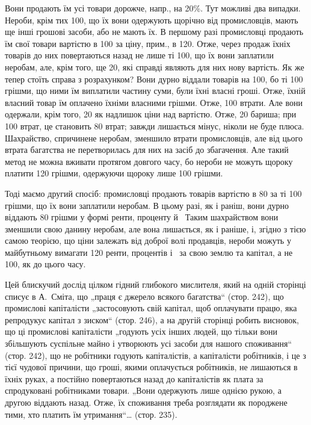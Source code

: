 \parcont{}  %
Вони продають їм усі товари дорожче, напр., на 20\%. Тут можливі два випадки. Нероби, крім
тих 100, що їх вони одержують щорічно від промисловців, мають ще інші грошові засоби, або
не мають їх. В першому разі промисловці продають їм свої товари вартістю в 100 за ціну,
прим., в 120. Отже, через продаж їхніх товарів до них повертаються назад не лише ті 100, що їх вони заплатили неробам, але, крім того, ще 20, які справді являють для них
нову вартість. Як же тепер стоїть справа з розрахунком? Вони дурно віддали товарів на 100,
бо ті 100 грішми, що ними їм виплатили частину суми, були їхні власні гроші. Отже, їхній
власний товар їм оплачено їхніми власними грішми. Отже, 100 втрати. Але вони одержали,
крім того, 20 як надлишок ціни над вартістю. Отже, 20 бариша; при 100
втрат, це становить 80 втрат; завжди лишається мінус, ніколи не буде плюса. Шахрайство,
спричинене неробам, зменшило втрати промисловців, але від цього втрата багатства не перетворилась
для них на засіб до збагачення. Але такий метод не можна вживати протягом довгого часу, бо нероби не
можуть щороку платити 120 грішми, одержуючи щороку лише 100 грішми.

Тоді маємо другий спосіб: промисловці продають товарів вартістю в 80 за ті 100
грішми, що їх вони заплатили неробам. В цьому разі, як і раніш, вони дурно віддають 80
грішми у формі ренти, проценту й~ Таким шахрайством вони зменшили свою данину неробам, але
вона лишається, як і раніше, і, згідно з тією самою теорією, що ціни залежать від доброї волі
продавців, нероби можуть у майбутньому вимагати 120 ренти, процентів і~ за свою
землю та капітал, а не 100, як до цього часу.

Цей блискучий дослід цілком гідний глибокого мислителя, який на одній сторінці списує в А.~Сміта, що
„праця є джерело всякого багатства“ (стор. 242), що промислові капіталісти „застосовують свій
капітал, щоб оплачувати працю, яка репродукує капітал з зиском“ (стор. 246), а на другій сторінці
робить висновок, що ці промислові капіталісти „годують
усіх інших людей, що тільки вони збільшують суспільне майно і утворюють усі засоби для нашого
споживання“ (стор. 242), що не робітники годують капіталістів, а капіталісти робітників, і це з тієї
чудової причини, що гроші, якими оплачується робітників, не лишаються в їхніх руках, а постійно
повертаються назад до капіталістів як плата за спродуковані робітниками товари. „Вони одержують лише
однією рукою, а другою віддають назад. Отже, їх споживання треба розглядати як породжене тими, хто
платить їм утримання“\dots{} (стор. 235).

